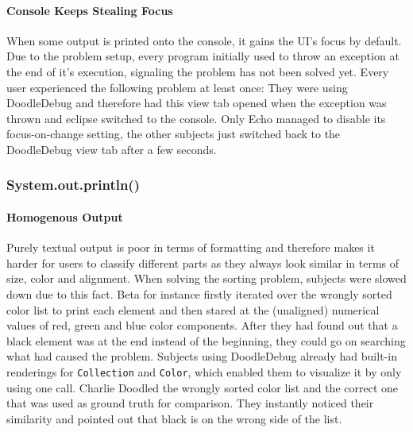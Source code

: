 \documentclass[english]{acm_proc_article-sp}
\begin{document}
\paragraph{Console Keeps Stealing Focus}
\label{console-focus-problem}
When some output is printed onto the console, it gains the UI's focus by default. 
Due to the problem setup, every program initially used to throw an exception at the end of it's execution, signaling the problem has not been solved yet. 
Every user experienced the following problem at least once: They were using DoodleDebug and therefore had this view tab opened when the exception was thrown and eclipse switched to the console. 
Only Echo managed to disable its focus-on-change setting, the other subjects just switched back to the DoodleDebug view tab after a few seconds.

\subsubsection{System.out.println()}
\paragraph{Homogenous Output}
Purely textual output is poor in terms of formatting and therefore makes it harder for users to classify different parts as they always look similar in terms of size, color and alignment. 
When solving the sorting problem, subjects were slowed down due to this fact. 
Beta for instance firstly iterated over the wrongly sorted color list to print each element and then stared at the (unaligned) numerical values of red, green and blue color components. 
After they had found out that a black element was at the end instead of the beginning, they could go on searching what had caused the problem. 
Subjects using DoodleDebug already had built-in renderings for \texttt{Collection}  and \texttt{Color}, which enabled them to visualize it by only using one call. 
Charlie Doodled the wrongly sorted color list and the correct one that was used as ground truth for comparison. 
They instantly noticed their similarity and pointed out that black is on the wrong side of the list.
\end{document}
